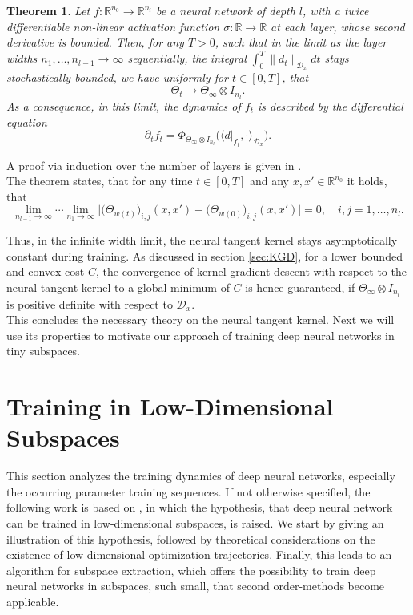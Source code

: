 \documentclass[11pt, a4paper]{article}
\newtheorem{theorem}{Theorem}[section]
\newcommand{\R}{\mathbb{R}}
\newcommand{\D}{\mathcal{D}}
\begin{document}
\begin{theorem} \label{thm:ntk}
Let $f: \R^{n_0} \to \R^{n_l}$ be a neural network of depth $l$, with a twice differentiable non-linear activation function $\sigma : \R \to \R$ at each layer, whose second derivative is bounded. Then, for any $T>0$, such that in the limit as the layer widths $n_1, \dots, n_{l-1} \to \infty$ sequentially, the integral $\int_{0}^{T} \| d_t \|_{\D_x}dt$ stays stochastically bounded, we have uniformly for $t \in [0,T]$, that
\[ \Theta_t \to \Theta_{\infty} \otimes I_{n_l}. \]
As a consequence, in this limit, the dynamics of $f_t$ is described by the differential equation
\[ \partial_tf_t = \Phi_{\Theta_{\infty} \otimes I_{n_l}} \Big ( \big \langle d|_{f_t}, \cdot \big \rangle_{\D_x} \Big ). \]
\end{theorem}

A proof via induction over the number of layers is given in \cite{NTK}. \\

The theorem states, that for any time $t \in [0,T]$ and any $x,x' \in \R^{n_0}$ it holds, that
\[ \lim_{n_{l-1} \to \infty} \cdots \lim_{n_1 \to \infty} \Big | \big (\Theta_{w(t)} \big )_{i,j}(x,x') - \big (\Theta_{w(0)} \big )_{i,j}(x,x') \Big | = 0, \quad i,j=1,\dots,n_l. \]

Thus, in the infinite width limit, the neural tangent kernel stays asymptotically constant during training. As discussed in section \ref{sec:KGD}, for a lower bounded and convex cost $C$, the convergence of kernel gradient descent with respect to the neural tangent kernel to a global minimum of $C$ is hence guaranteed, if $\Theta_{\infty} \otimes I_{n_l}$ is positive definite with respect to $\D_x$. \\

This concludes the necessary theory on the neural tangent kernel. Next we will use its properties to motivate our approach of training deep neural networks in tiny subspaces.

\pagebreak
\section{Training in Low-Dimensional Subspaces} \label{sec:subspaces}

This section analyzes the training dynamics of deep neural networks, especially the occurring parameter training sequences.
If not otherwise specified, the following work is based on \cite{Paper}, in which the hypothesis, that deep neural network can be trained in low-dimensional subspaces, is raised. We start by giving an illustration of this hypothesis, followed by theoretical considerations on the existence of low-dimensional optimization trajectories. Finally, this leads to an algorithm for subspace extraction, which offers the possibility to train deep neural networks in subspaces, such small, that second order-methods become applicable.
\end{document}
